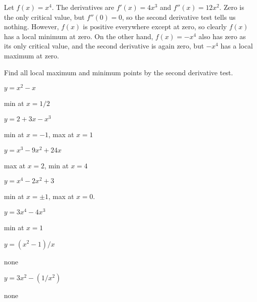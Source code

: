 \begin{example}
Let $f(x)=x^4$. The derivatives are $f'(x)=4x^3$ and
$f''(x)=12x^2$. Zero is the only critical value, but $f''(0)=0$, so
the second derivative test tells us nothing. However, $f(x)$ is
positive everywhere except at zero, so clearly $f(x)$ has a local
minimum at zero. On the other hand, $f(x)=-x^4$ also has zero as its
only critical value, and the second derivative is again zero, but
$-x^4$ has a local maximum at zero.
\end{example}

\begin{exercises}
Find all local maximum and minimum points by the second derivative
test. 

\twocol
\begin{exercise} $y=x^2-x$ 
\begin{answer} min at $x=1/2$
\end{answer}\end{exercise}

\begin{exercise} $y=2+3x-x^3$ 
\begin{answer} min at $x=-1$, max at $x=1$
\end{answer}\end{exercise}

\begin{exercise} $y=x^3-9x^2+24x$
\begin{answer} max at $x=2$, min at $x=4$
\end{answer}\end{exercise}

\begin{exercise} $y=x^4-2x^2+3$ 
\begin{answer} min at $x=\pm 1$, max at $x=0$.
\end{answer}\end{exercise}

\begin{exercise} $y=3x^4-4x^3$
\begin{answer} min at $x=1$
\end{answer}\end{exercise}

\begin{exercise} $y=(x^2-1)/x$
\begin{answer} none
\end{answer}\end{exercise}

\begin{exercise} $y=3x^2-(1/x^2)$ 
\begin{answer} none
\end{answer}\end{exercise}


\end{exercises}

